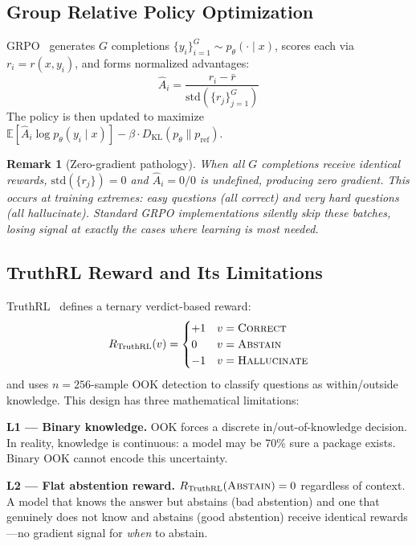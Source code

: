\documentclass[11pt]{article}
\newtheorem{remark}{Remark}
\begin{document}
\subsection{Group Relative Policy Optimization}

GRPO~\cite{deepseek2024grpo} generates $G$ completions $\{y_i\}_{i=1}^G \sim p_\theta(\cdot \mid x)$, scores each via $r_i = r(x, y_i)$, and forms normalized advantages:
\begin{equation}
\hat{A}_i = \frac{r_i - \bar{r}}{\text{std}(\{r_j\}_{j=1}^G)}
\label{eq:grpo_adv}
\end{equation}
The policy is then updated to maximize $\mathbb{E}[\hat{A}_i \log p_\theta(y_i \mid x)] - \beta \cdot D_{\text{KL}}(p_\theta \| p_{\text{ref}})$.

\begin{remark}[Zero-gradient pathology]
When all $G$ completions receive identical rewards, $\text{std}(\{r_j\}) = 0$ and $\hat{A}_i = 0/0$ is undefined, producing zero gradient. This occurs at training extremes: easy questions (all correct) and very hard questions (all hallucinate). Standard GRPO implementations silently skip these batches, losing signal at exactly the cases where learning is most needed.
\end{remark}

\subsection{TruthRL Reward and Its Limitations}
\label{sec:truthrl-limits}

TruthRL~\cite{truthrl2025} defines a ternary verdict-based reward:
\begin{equation}
R_{\text{TruthRL}}(v) = \begin{cases} +1 & v = \textsc{Correct} \\ 0 & v = \textsc{Abstain} \\ -1 & v = \textsc{Hallucinate} \end{cases}
\label{eq:truthrl}
\end{equation}
and uses $n=256$-sample OOK detection to classify questions as within/outside knowledge. This design has three mathematical limitations:

\textbf{L1 — Binary knowledge.} OOK forces a discrete in/out-of-knowledge decision. In reality, knowledge is continuous: a model may be 70\% sure a package exists. Binary OOK cannot encode this uncertainty.

\textbf{L2 — Flat abstention reward.} $R_{\text{TruthRL}}(\textsc{Abstain}) = 0$ regardless of context. A model that knows the answer but abstains (bad abstention) and one that genuinely does not know and abstains (good abstention) receive identical rewards---no gradient signal for \emph{when} to abstain.
\end{document}
